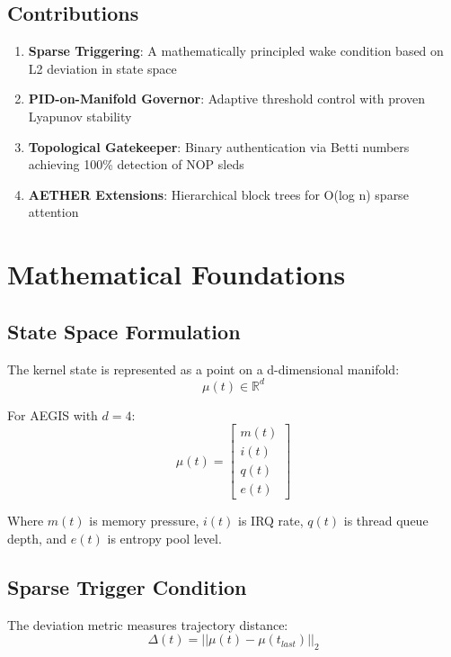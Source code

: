 \documentclass[conference]{IEEEtran}
\begin{document}
\subsection{Contributions}

\begin{enumerate}
\item \textbf{Sparse Triggering}: A mathematically principled wake condition based on L2 deviation in state space
\item \textbf{PID-on-Manifold Governor}: Adaptive threshold control with proven Lyapunov stability
\item \textbf{Topological Gatekeeper}: Binary authentication via Betti numbers achieving 100\% detection of NOP sleds
\item \textbf{AETHER Extensions}: Hierarchical block trees for O(log n) sparse attention
\end{enumerate}

\section{Mathematical Foundations}

\subsection{State Space Formulation}

The kernel state is represented as a point on a d-dimensional manifold:
\begin{equation}
\mu(t) \in \mathbb{R}^d
\end{equation}

For AEGIS with $d=4$:
\begin{equation}
\mu(t) = \begin{bmatrix} m(t) \\ i(t) \\ q(t) \\ e(t) \end{bmatrix}
\end{equation}

Where $m(t)$ is memory pressure, $i(t)$ is IRQ rate, $q(t)$ is thread queue depth, and $e(t)$ is entropy pool level.

\subsection{Sparse Trigger Condition}

The deviation metric measures trajectory distance:
\begin{equation}
\Delta(t) = ||\mu(t) - \mu(t_{last})||_2
\end{equation}
\end{document}
